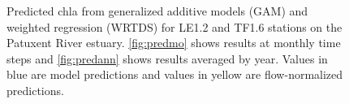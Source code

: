 \documentclass[letterpaper,12pt,oneside]{article}\usepackage[]{graphicx}\usepackage[]{color}
\begin{document}
\begin{figure}
\centering
{}


\caption{Predicted \ac{chla} from generalized additive models (GAM) and weighted regression (WRTDS) for LE1.2 and TF1.6 stations on the Patuxent River estuary.  \cref{fig:predmo} shows results at monthly time steps and \cref{fig:predann} shows results averaged by year.  Values in blue are model predictions and values in yellow are flow-normalized predictions.}
\label{fig:pred}
\end{figure}
\end{document}
